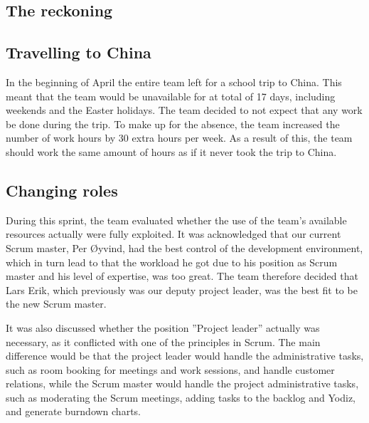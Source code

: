 \subsection{The reckoning}


\subsection{Travelling to China}
In the beginning of April the entire team left for a school trip to China. This meant that the team would be unavailable for at total of 17 days, including weekends and the Easter holidays. The team decided to not expect that any work be done during the trip. To make up for the absence, the team increased the number of work hours by 30 extra hours per week. As a result of this, the team should work the same amount of hours as if it never took the trip to China.

\subsection{Changing roles}
\label{sec:unbalancedWorkload}
During this sprint, the team evaluated whether the use of the team's available resources actually were fully exploited. It was acknowledged that our current Scrum master, Per Øyvind, had the best control of the development environment, which in turn lead to that the workload he got due to his position as Scrum master and his level of expertise, was too great. The team therefore decided that Lars Erik, which previously was our deputy project leader, was the best fit to be the new Scrum master.

It was also discussed whether the position ''Project leader'' actually was necessary, as it conflicted with one of the principles in Scrum.  The main difference would be that the project leader would handle the administrative tasks, such as room booking for meetings and work sessions, and handle customer relations, while the Scrum master would handle the project administrative tasks, such as moderating the Scrum meetings, adding tasks to the backlog and Yodiz, and generate burndown charts.